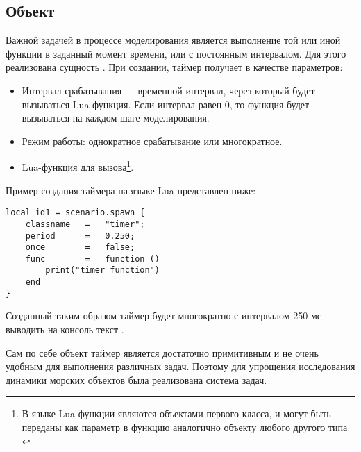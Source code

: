 %

\subsection{Объект }

Важной задачей в процессе моделирования является выполнение той или иной функции в заданный момент времени, или с постоянным интервалом. Для этого реализована сущность . При создании, таймер получает в качестве параметров:
\begin{itemize}
	\item	Интервал срабатывания --- временной интервал, через который 
			будет вызываться Lua-функция. Если интервал равен $0$, 
			то функция будет вызываться на каждом шаге моделирования.
	\item	Режим работы: однократное срабатывание или многократное.
	\item	Lua-функция для вызова\footnote{В языке Lua функции являются 
			объектами первого класса, и могут быть переданы как параметр 
			в функцию аналогично объекту любого другого типа \citep{implua}}.
\end{itemize}

Пример создания таймера на языке Lua представлен ниже:

\begin{lstlisting}[caption={Пример создания таймера}]
local id1 = scenario.spawn {
    classname   =   "timer";
    period      =   0.250;         
    once        =   false;      
    func        =   function () 
        print("timer function")
    end
}
\end{lstlisting}

Созданный таким образом таймер будет многократно с интервалом 250 мс выводить на консоль текст .

Сам по себе объект таймер является достаточно примитивным и не очень удобным для выполнения различных задач. 
Поэтому для упрощения исследования динамики морских объектов была реализована система задач.

